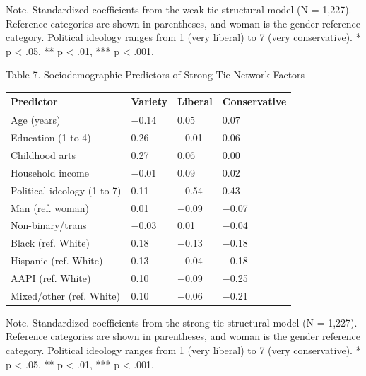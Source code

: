 \documentclass[
  12pt
]{article}
\begin{document}
Note. Standardized coefficients from the weak-tie structural model (N = 1,227). Reference categories are shown in parentheses, and woman is the gender reference category. Political ideology ranges from 1 (very liberal) to 7 (very conservative). * p < .05, ** p < .01, *** p < .001.

Table 7. Sociodemographic Predictors of Strong-Tie Network Factors

\begin{tabular*}{\textwidth}{@{\extracolsep{\fill}}>{\raggedright\arraybackslash}p{} @{\hspace{1pt}}>{\raggedleft\arraybackslash}p{}@{\hspace{1pt}}>{\raggedleft\arraybackslash}p{}@{\hspace{1pt}}>{\raggedleft\arraybackslash}p{}@{\hspace{1.5em}}@{}}
\toprule
Predictor & Variety & Liberal & Conservative \\
\midrule
Age (years) & $-$0.14\rlap{***} & \hphantom{$-$}0.05 & \hphantom{$-$}0.07\rlap{**} \\
Education (1 to 4) & \hphantom{$-$}0.26\rlap{***} & $-$0.01 & \hphantom{$-$}0.06\rlap{*} \\
Childhood arts & \hphantom{$-$}0.27\rlap{***} & \hphantom{$-$}0.06\rlap{*} & \hphantom{$-$}0.00 \\
Household income & $-$0.01 & \hphantom{$-$}0.09\rlap{**} & \hphantom{$-$}0.02 \\
Political ideology (1 to 7) & \hphantom{$-$}0.11\rlap{***} & $-$0.54\rlap{***} & \hphantom{$-$}0.43\rlap{***} \\
Man (ref. woman) & \hphantom{$-$}0.01 & $-$0.09\rlap{**} & $-$0.07\rlap{*} \\
Non-binary/trans & $-$0.03 & \hphantom{$-$}0.01 & $-$0.04 \\
Black (ref. White) & \hphantom{$-$}0.18\rlap{***} & $-$0.13\rlap{***} & $-$0.18\rlap{***} \\
Hispanic (ref. White) & \hphantom{$-$}0.13\rlap{***} & $-$0.04 & $-$0.18\rlap{***} \\
AAPI (ref. White) & \hphantom{$-$}0.10\rlap{***} & $-$0.09\rlap{***} & $-$0.25\rlap{***} \\
Mixed/other (ref. White) & \hphantom{$-$}0.10\rlap{***} & $-$0.06\rlap{*} & $-$0.21\rlap{***} \\
\bottomrule
\end{tabular*}

Note. Standardized coefficients from the strong-tie structural model (N = 1,227). Reference categories are shown in parentheses, and woman is the gender reference category. Political ideology ranges from 1 (very liberal) to 7 (very conservative). * p < .05, ** p < .01, *** p < .001.
\end{document}
